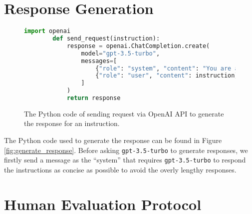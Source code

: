 \documentclass[11pt]{article}
\newcommand{\llm}[1]{\texttt{#1}\xspace}
\newcommand{\chatgpt}{\llm{gpt-3.5-turbo}}
\begin{document}
\section{Response Generation}
\begin{figure}[t]
    \centering
    \footnotesize
    \begin{lstlisting}[language=Python,numbers=none]
        import openai
        def send_request(instruction):
            response = openai.ChatCompletion.create(
                model="gpt-3.5-turbo",
                messages=[
                    {"role": "system", "content": "You are a helpful assistant, but you must respond the provided instructions as concise as possible."},
                    {"role": "user", "content": instruction}
                ]
            )
            return response
    \end{lstlisting}
    \caption{The Python code of sending request via OpenAI API to generate the response for an instruction.}
    \label{fig:generate_response}
\end{figure} The Python code used to generate the response can be found in Figure \autoref{fig:generate_response}.
Before asking \chatgpt to generate responses, we firstly send a message as the ``system'' that requires \chatgpt to respond the instructions as concise as possible to avoid the overly lengthy responses.

\section{Human Evaluation Protocol}
\label{sec:human_evaluation_protocol}
\end{document}
